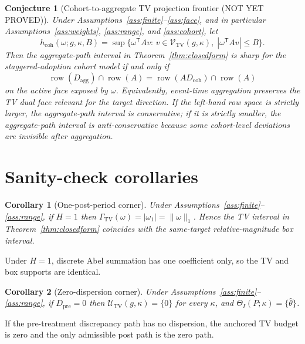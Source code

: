 \documentclass[11pt]{article}
\newcommand{\transpose}{\mathsf{T}}
\theoremstyle{definition}
\theoremstyle{plain}
\newtheorem{conjecture}{Conjecture}
\newtheorem{corollary}{Corollary}
\theoremstyle{remark}
\begin{document}
\begin{conjecture}[Cohort-to-aggregate TV projection frontier {\normalfont (NOT YET PROVED)}]\label{conj:projection}
Under Assumptions~\ref{ass:finite}--\ref{ass:face}, and in particular Assumptions~\ref{ass:weights}, \ref{ass:range}, and \ref{ass:cohort}, let
\[
h_{\mathrm{coh}}(\omega;g,\kappa,B)
=
\sup\{\omega^\transpose Av:\,
v\in\mathcal V_{\mathrm{TV}}(g,\kappa),\;
|\omega^\transpose Av|\le B\}.
\]
Then the aggregate-path interval in Theorem~\ref{thm:closedform} is sharp for the staggered-adoption cohort model if and only if
\[
\operatorname{row}(D_{\mathrm{agg}})
\cap \operatorname{row}(A)
=
\operatorname{row}(A D_{\mathrm{coh}})
\cap \operatorname{row}(A)
\]
on the active face exposed by \(\omega\). Equivalently, event-time aggregation preserves the TV dual face relevant for the target direction. If the left-hand row space is strictly larger, the aggregate-path interval is conservative; if it is strictly smaller, the aggregate-path interval is anti-conservative because some cohort-level deviations are invisible after aggregation.
\end{conjecture}

\section{Sanity-check corollaries}
\begin{corollary}[One-post-period corner]\label{cor:onepost}
Under Assumptions~\ref{ass:finite}--\ref{ass:range}, if \(H=1\) then \(\Gamma_{\mathrm{TV}}(\omega)=|\omega_1|=\|\omega\|_1\). Hence the TV interval in Theorem~\ref{thm:closedform} coincides with the same-target relative-magnitude box interval.
\end{corollary}
\noindent
Under \(H=1\), discrete Abel summation has one coefficient only, so the TV and box supports are identical.

\begin{corollary}[Zero-dispersion corner]\label{cor:zerodisp}
Under Assumptions~\ref{ass:finite}--\ref{ass:range}, if \(D_{\mathrm{pre}}=0\) then \(\mathcal U_{\mathrm{TV}}(g,\kappa)=\{0\}\) for every \(\kappa\), and \(\Theta_I(P;\kappa)=\{\hat\theta\}\).
\end{corollary}
\noindent
If the pre-treatment discrepancy path has no dispersion, the anchored TV budget is zero and the only admissible post path is the zero path.
\end{document}
